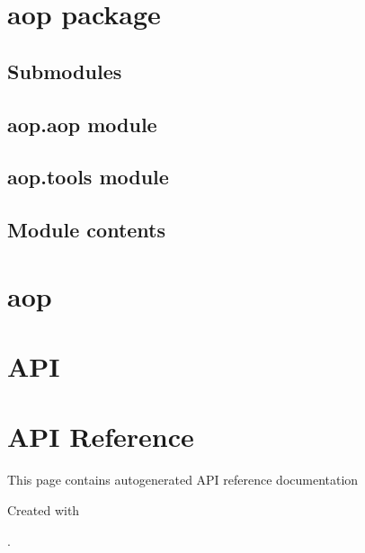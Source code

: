 \documentclass[letterpaper,10pt,english]{sphinxmanual}
\begin{document}
\chapter{aop package}
\label{\detokenize{aop:aop-package}}\label{\detokenize{aop::doc}}

\section{Submodules}
\label{\detokenize{aop:submodules}}

\section{aop.aop module}
\label{\detokenize{aop:aop-aop-module}}

\section{aop.tools module}
\label{\detokenize{aop:aop-tools-module}}

\section{Module contents}
\label{\detokenize{aop:module-contents}}
\sphinxstepscope


\chapter{aop}
\label{\detokenize{modules:aop}}\label{\detokenize{modules::doc}}
\sphinxstepscope


\chapter{API}
\label{\detokenize{api:api}}\label{\detokenize{api::doc}}

\begin{savenotes}\sphinxattablestart
\sphinxthistablewithglobalstyle
\sphinxthistablewithnovlinesstyle
\centering
\begin{tabulary}{\linewidth}[t]{}
\sphinxtoprule
\sphinxtableatstartofbodyhook\sphinxbottomrule
\end{tabulary}
\sphinxtableafterendhook\par
\sphinxattableend\end{savenotes}

\sphinxstepscope


\chapter{API Reference}
\label{\detokenize{autoapi/index:api-reference}}\label{\detokenize{autoapi/index::doc}}
\sphinxAtStartPar
This page contains auto\sphinxhyphen{}generated API reference documentation %
\begin{footnote}[1]\sphinxAtStartFootnote
Created with 
%
\end{footnote}.
\end{document}
